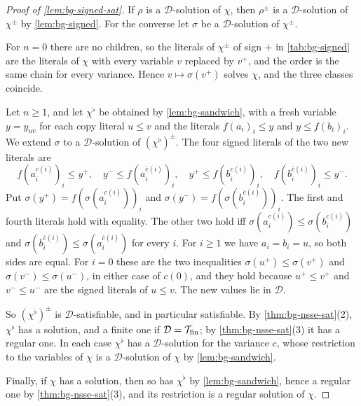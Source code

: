 \begin{proof}[Proof of \cref{lem:bg-signed-sat}]
If $\rho$ is a $\mathcal D$-solution of $\chi$, then $\rho^\pm$ is a
$\mathcal D$-solution of $\chi^\pm$ by \cref{lem:bg-signed}. For the converse
let $\sigma$ be a $\mathcal D$-solution of $\chi^\pm$.

For $n=0$ there are no children, so the literals of $\chi^\pm$ of sign $+$ in
\cref{tab:bg-signed} are the literals of $\chi$ with every variable $v$ replaced
by $v^+$, and the order is the same chain for every variance. Hence
$v\mapsto\sigma(v^+)$ solves $\chi$, and the three classes coincide.

Let $n\ge1$, and let $\chi^\flat$ be obtained by \cref{lem:bg-sandwich}, with
a fresh variable $y=y_{uv}$ for each copy literal $u\le v$ and the literals
$f(a_i)_i\le y$ and $y\le f(b_i)_i$. We extend $\sigma$ to a $\mathcal
D$-solution of $(\chi^\flat)^\pm$. The four signed literals of the two new
literals are
\[
 f(a_i^{c(i)})_i\le y^+,\quad y^-\le f(a_i^{\bar c(i)})_i,\quad
 y^+\le f(b_i^{c(i)})_i,\quad f(b_i^{\bar c(i)})_i\le y^- .
\]
Put $\sigma(y^+)=f(\sigma(a_i^{c(i)}))_i$ and
$\sigma(y^-)=f(\sigma(b_i^{\bar c(i)}))_i$. The first and fourth literals hold
with equality. The other two hold iff
$\sigma(a_i^{c(i)})\le\sigma(b_i^{c(i)})$ and
$\sigma(b_i^{\bar c(i)})\le\sigma(a_i^{\bar c(i)})$ for every $i$. For $i\ge1$
we have $a_i=b_i=u$, so both sides are equal. For $i=0$ these are the two inequalities
$\sigma(u^+)\le\sigma(v^+)$ and $\sigma(v^-)\le\sigma(u^-)$, in either case of
$c(0)$, and they hold because $u^+\le v^+$ and $v^-\le u^-$ are the signed
literals of $u\le v$. The new values lie in $\mathcal D$.

So $(\chi^\flat)^\pm$ is $\mathcal D$-satisfiable, and in particular satisfiable.
By \cref{thm:bg-nsse-sat}(2), $\chi^\flat$ has a solution, and a finite one
if $\mathcal D=\mathcal{T}_{\mathrm{fin}}$; by \cref{thm:bg-nsse-sat}(3) it has a
regular one. In each case $\chi^\flat$ has a $\mathcal D$-solution for the
variance $c$, whose restriction to the variables of $\chi$ is a
$\mathcal D$-solution of $\chi$ by \cref{lem:bg-sandwich}.

Finally, if $\chi$ has a solution, then so has $\chi^\flat$ by
\cref{lem:bg-sandwich}, hence a regular one by \cref{thm:bg-nsse-sat}(3),
and its restriction is a regular solution of $\chi$.
\end{proof}
